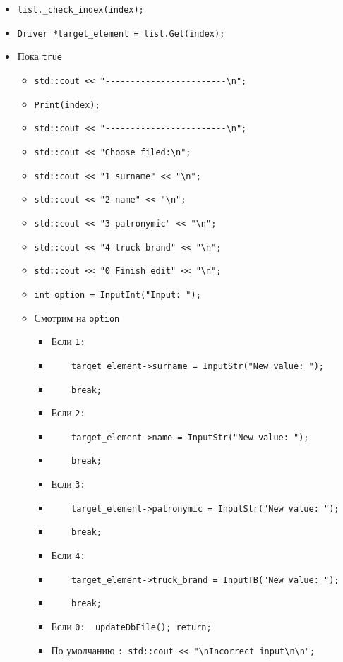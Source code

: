 \begin{itemize}
    \item \verb|list._check_index(index);|
    \item \verb|Driver *target_element = list.Get(index);|
    \item Пока \verb|true|
        \begin{itemize}
            \item \verb|std::cout << "------------------------\n";|
            \item \verb|Print(index);|
            \item \verb|std::cout << "------------------------\n";|
            \item \verb|std::cout << "Choose filed:\n";|
            \item \verb|std::cout << "1 surname" << "\n";|
            \item \verb|std::cout << "2 name" << "\n";|
            \item \verb|std::cout << "3 patronymic" << "\n";|
            \item \verb|std::cout << "4 truck brand" << "\n";|
            \item \verb|std::cout << "0 Finish edit" << "\n";|
            \item \verb|int option = InputInt("Input: ");|
            \item Смотрим на \verb|option|
            \begin{itemize}
                \item Если \verb|1:|
                \item \verb|    target_element->surname = InputStr("New value: ");|
                \item \verb|    break;|
                \item Если \verb|2:|
                \item \verb|    target_element->name = InputStr("New value: ");|
                \item \verb|    break;|
                \item Если \verb|3:|
                \item \verb|    target_element->patronymic = InputStr("New value: ");|
                \item \verb|    break;|
                \item Если \verb|4:|
                \item \verb|    target_element->truck_brand = InputTB("New value: ");|
                \item \verb|    break;|
                \item Если \verb|0: _updateDbFile(); return;|
                \item По умолчанию \verb|: std::cout << "\nIncorrect input\n\n";|
            \end{itemize}
        \end{itemize}
\end{itemize}

